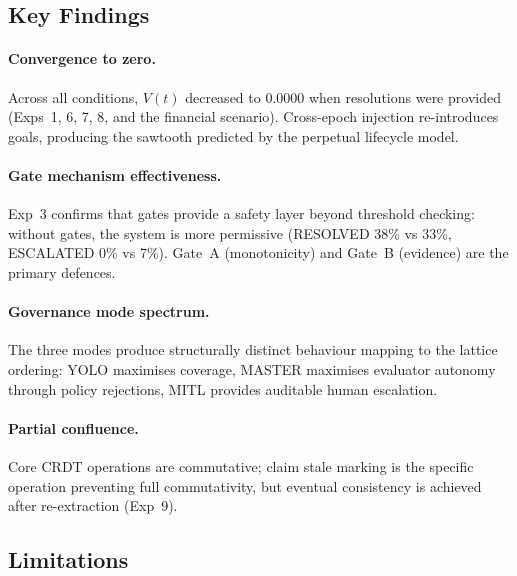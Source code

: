\documentclass[11pt]{article}
\begin{document}
\subsection{Key Findings}

\paragraph{Convergence to zero.}
Across all conditions, $V(t)$ decreased to 0.0000 when resolutions were provided (Exps~1, 6, 7, 8, and the financial scenario).
Cross-epoch injection re-introduces goals, producing the sawtooth predicted by the perpetual lifecycle model.

\paragraph{Gate mechanism effectiveness.}
Exp~3 confirms that gates provide a safety layer beyond threshold checking: without gates, the system is more permissive (RESOLVED 38\% vs 33\%, ESCALATED 0\% vs 7\%).
Gate~A (monotonicity) and Gate~B (evidence) are the primary defences.

\paragraph{Governance mode spectrum.}
The three modes produce structurally distinct behaviour mapping to the lattice ordering: YOLO maximises coverage, MASTER maximises evaluator autonomy through policy rejections, MITL provides auditable human escalation.

\paragraph{Partial confluence.}
Core CRDT operations are commutative; claim stale marking is the specific operation preventing full commutativity, but eventual consistency is achieved after re-extraction (Exp~9).

\subsection{Limitations}
\end{document}
